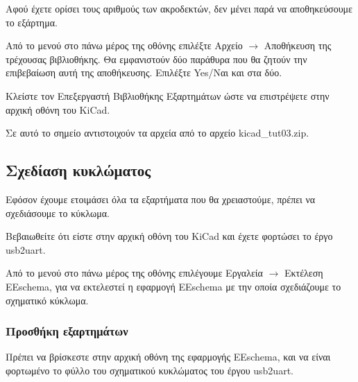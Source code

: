 \documentclass[a4paper]{article}
\begin{document}
\begin{figure}
  \begin{center}
    \label{fig:kicad-main}
  \end{center}
\end{figure}

Αφού έχετε ορίσει τους αριθμούς των ακροδεκτών, δεν μένει παρά να αποθηκεύσουμε το εξάρτημα.

Από το μενού στο πάνω μέρος της οθόνης επιλέξτε Αρχείο $\rightarrow$ Αποθήκευση της τρέχουσας βιβλιοθήκης. Θα εμφανιστούν δύο παράθυρα που θα ζητούν την επιβεβαίωση αυτή της αποθήκευσης. Επιλέξτε Yes/Ναι και στα δύο.

Kλείστε τον Επεξεργαστή Βιβλιοθήκης Εξαρτημάτων ώστε να επιστρέψετε στην αρχική οθόνη του \textenglish{KiCad}.

Σε αυτό το σημείο αντιστοιχούν τα αρχεία από το αρχείο kicad\_tut03.zip.

\subsection{Σχεδίαση κυκλώματος}
Εφόσον έχουμε ετοιμάσει όλα τα εξαρτήματα που θα χρειαστούμε, πρέπει να σχεδιάσουμε το κύκλωμα. 

Βεβαιωθείτε ότι είστε στην αρχική οθόνη του \textenglish{KiCad} και έχετε φορτώσει το έργο usb2uart.

Από το μενού στο πάνω μέρος της οθόνης επιλέγουμε Εργαλεία $\rightarrow$ Εκτέλεση \textenglish{EEschema}, για να εκτελεστεί η εφαρμογή \textenglish{EEschema} με την οποία σχεδιάζουμε το σχηματικό κύκλωμα. 

\subsubsection{Προσθήκη εξαρτημάτων}

Πρέπει να βρίσκεστε στην αρχική οθόνη της εφαρμογής \textenglish{EEschema}, και να είναι φορτωμένο το φύλλο του σχηματικού κυκλώματος του έργου usb2uart.

\begin{figure}
  \begin{center}
    \label{fig:kicad-main}
  \end{center}
\end{figure}
\end{document}
